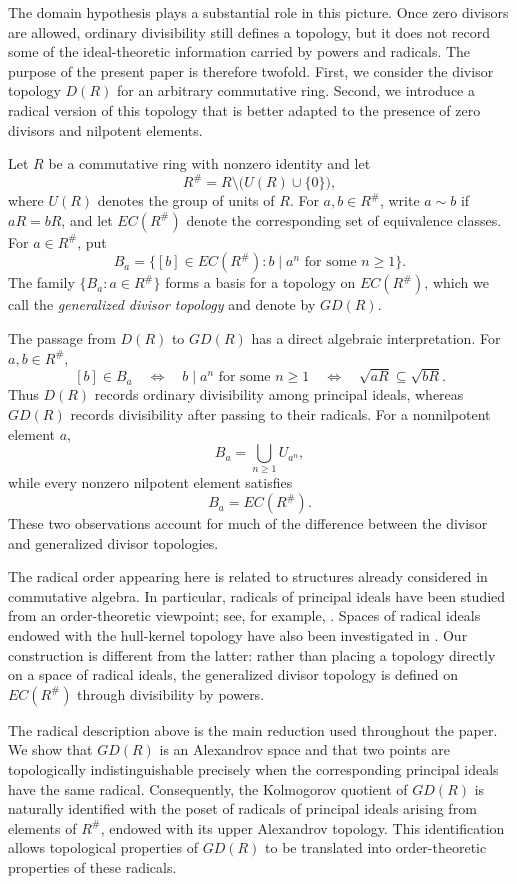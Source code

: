 \documentclass[11pt]{amsart}
\theoremstyle{plain}
\theoremstyle{definition}
\theoremstyle{remark}
\numberwithin{equation}{section}
\begin{document}
The domain hypothesis plays a substantial role in this picture. Once zero
divisors are allowed, ordinary divisibility still defines a topology, but it
does not record some of the ideal-theoretic information carried by powers and
radicals. The purpose of the present paper is therefore twofold. First, we
consider the divisor topology $D(R)$ for an arbitrary commutative ring.
Second, we introduce a radical version of this topology that is better adapted
to the presence of zero divisors and nilpotent elements.

Let $R$ be a commutative ring with nonzero identity and let
\[
R^\#=R\setminus\bigl(U(R)\cup\{0\}\bigr),
\]
where $U(R)$ denotes the group of units of $R$. For $a,b\in R^\#$, write
$a\sim b$ if $aR=bR$, and let $EC(R^\#)$ denote the corresponding set of
equivalence classes. For $a\in R^\#$, put
\[
B_a=\{[b]\in EC(R^\#):b\mid a^n
\text{ for some }n\geq1\}.
\]
The family $\{B_a:a\in R^\#\}$ forms a basis for a topology on
$EC(R^\#)$, which we call the \emph{generalized divisor topology} and
denote by $GD(R)$.

The passage from $D(R)$ to $GD(R)$ has a direct algebraic interpretation.
For $a,b\in R^\#$,
\[
[b]\in B_a
\quad\Longleftrightarrow\quad
b\mid a^n\text{ for some }n\geq1
\quad\Longleftrightarrow\quad
\sqrt{aR}\subseteq\sqrt{bR}.
\]
Thus $D(R)$ records ordinary divisibility among principal ideals, whereas
$GD(R)$ records divisibility after passing to their radicals. For a
nonnilpotent element $a$,
\[
B_a=\bigcup_{n\geq1}U_{a^n},
\]
while every nonzero nilpotent element satisfies
\[
B_a=EC(R^\#).
\]
These two observations account for much of the difference between the divisor
and generalized divisor topologies.

The radical order appearing here is related to structures already considered in
commutative algebra. In particular, radicals of principal ideals have
been studied from an order-theoretic viewpoint; see, for example,
\cite{Spirito}. Spaces of radical ideals endowed with the hull-kernel
topology have also been investigated in
\cite{FinocchiaroFontanaSpirito}. Our construction is different from
the latter: rather than placing a topology directly on a space of
radical ideals, the generalized divisor topology is defined on
$EC(R^\#)$ through divisibility by powers.

The radical description above is the main reduction used throughout the paper.
We show that $GD(R)$ is an Alexandrov space and that two points are
topologically indistinguishable precisely when the corresponding principal
ideals have the same radical. Consequently, the Kolmogorov quotient of
$GD(R)$ is naturally identified with the poset of radicals of principal
ideals arising from elements of $R^\#$, endowed with its upper Alexandrov
topology. This identification allows topological properties of $GD(R)$ to be
translated into order-theoretic properties of these radicals.
\end{document}
